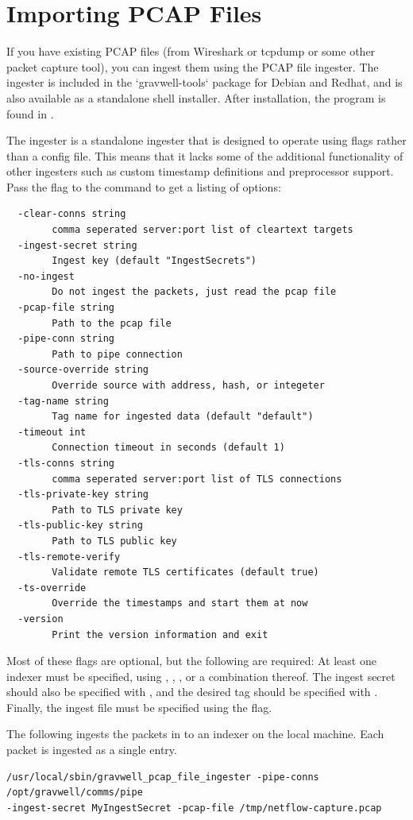 \section{Importing PCAP Files}
If you have existing PCAP files (from Wireshark or tcpdump or some other packet capture tool), you can ingest them using the PCAP file ingester.  The ingester is included in the `gravwell-tools` package for Debian and Redhat, and is also available as a standalone shell installer. After installation, the program is found in .

The ingester is a standalone ingester that is designed to operate using flags rather than a config file.  This means that it lacks some of the additional functionality of other ingesters such as custom timestamp definitions and preprocessor support.  Pass the  flag to the command to get a listing of options:

\begin{verbatim}
  -clear-conns string
    	comma seperated server:port list of cleartext targets
  -ingest-secret string
    	Ingest key (default "IngestSecrets")
  -no-ingest
    	Do not ingest the packets, just read the pcap file
  -pcap-file string
    	Path to the pcap file
  -pipe-conn string
    	Path to pipe connection
  -source-override string
    	Override source with address, hash, or integeter
  -tag-name string
    	Tag name for ingested data (default "default")
  -timeout int
    	Connection timeout in seconds (default 1)
  -tls-conns string
    	comma seperated server:port list of TLS connections
  -tls-private-key string
    	Path to TLS private key
  -tls-public-key string
    	Path to TLS public key
  -tls-remote-verify
    	Validate remote TLS certificates (default true)
  -ts-override
    	Override the timestamps and start them at now
  -version
    	Print the version information and exit
\end{verbatim}

Most of these flags are optional, but the following are required: At least one indexer must be specified, using , , , or a combination thereof. The ingest secret should also be specified with , and the desired tag should be specified with . Finally, the ingest file must be specified using the  flag.

The following ingests the packets in  to an indexer on the local machine. Each packet is ingested as a single entry.

\begin{verbatim}
/usr/local/sbin/gravwell_pcap_file_ingester -pipe-conns /opt/gravwell/comms/pipe 
-ingest-secret MyIngestSecret -pcap-file /tmp/netflow-capture.pcap
\end{verbatim}


